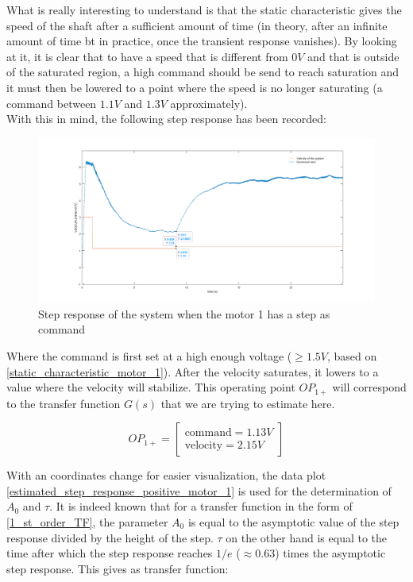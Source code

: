 What is really interesting to understand is that the static characteristic gives the speed of the shaft after a
sufficient amount of time (in theory, after an infinite amount of time bt in practice, once the transient response 
vanishes). By looking at it, it is clear that to have a speed that is different from $0 V$ and that is outside of the
saturated region, a high command should be send to reach saturation and it must then be lowered to a point where the
speed is no longer saturating (a command between $1.1 V$ and $1.3 V$ approximately).\\

With this in mind, the following step response has been recorded:

\begin{figure}[H]
    \centering
    \includegraphics[height=\textheight/3]{Pictures/step_response_positive_motor_1.png}
    \caption{Step response of the system when the motor 1 has a step as command}
    \label{step_response_positive_motor_1}
\end{figure}

Where the command is first set at a high enough voltage ($\geq 1.5 V$, based on \ref{static_characteristic_motor_1}). 
After the velocity saturates, it lowers to a value where the velocity will stabilize. This operating point 
\textit{$OP_{1+}$} will correspond to the transfer function $G(s)$ that we are trying to estimate here.

\begin{equation}
    OP_{1+} = \begin{bmatrix}
        \text{command} = 1.13 V \\
        \text{velocity} = 2.15 V
    \end{bmatrix}
\end{equation}

With an coordinates change for easier visualization, the data plot \ref{estimated_step_response_positive_motor_1} is 
used for the determination of $A_0$ and $\tau$. It is indeed known that for a transfer function in the form of 
\ref{1_st_order_TF}, the parameter $A_0$ is equal to the asymptotic value of the step response divided by the height of
the step. $\tau$ on the other hand is equal to the time after which the step response reaches $1/e$ ($\approx 0.63$)
times the asymptotic step response. This gives as transfer function:

